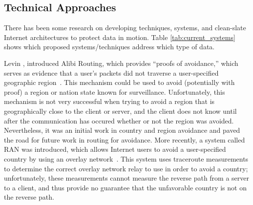 \subsection{Technical Approaches}
\label{sec:tech_motion}

There has been some research on developing techniques, systems, and clean-slate Internet architectures to protect data in motion.  Table \ref{tab:current_systems} shows which proposed systems/techniques address which type of data.


Levin \ea, introduced Alibi Routing, which provides ``proofs of avoidance,'' which serves as evidence that a user's packets did not traverse a user-specified geographic region~\cite{levin2015alibi}.  This mechanism could be used to avoid (potentially with proof) a region or nation state known for surveillance.  Unfortunately, this mechanism is not very successful when trying to avoid a region that is geographically close to the client or server, and the client does not know until after the communication has occured whether or not the region was avoided.  Nevertheless, it was an initial work in country and region avoidance and paved the road for future work in routing for avoidance.  More recently, a system called RAN was introduced, which allows Internet users to avoid a user-specified country by using an overlay network~\cite{edmundson2017ran}.  This system uses traceroute measurements to determine the correct overlay network relay to use in order to avoid a country; unfortunately, these measurements cannot measure the reverse path from a server to a client, and thus provide no guarantee that the unfavorable country is not on the reverse path.

